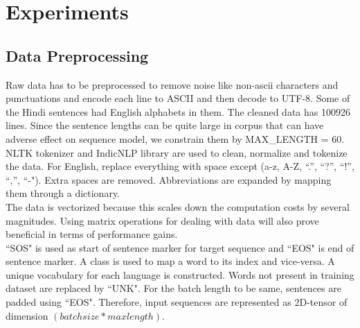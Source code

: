 \documentclass[11pt, oneside]{article}   	%
\begin{document}
\section{Experiments}

\subsection{Data Preprocessing}
Raw data has to be preprocessed to remove noise like non-ascii characters and punctuations and encode each line to ASCII and then decode to UTF-8. Some of the Hindi sentences had English alphabets in them. The cleaned data has 100926 lines. Since the sentence lengths can be quite large in corpus that can have adverse effect on sequence model, we constrain them by MAX\_LENGTH = 60.\\
NLTK tokenizer and IndicNLP library are used to clean, normalize and tokenize the data. For English, replace everything with space except (a-z, A-Z, “.”, “?”, “!”, “,”, ``-"). Extra spaces are removed. Abbreviations are expanded by mapping them through a dictionary.\\
The data is vectorized because this scales down the computation costs by several magnitudes. Using matrix operations for dealing with data will also prove beneficial in terms of performance gains.\\
``SOS" is used as start of sentence marker for target sequence and 	``EOS" is end of sentence marker. A class is used to map a word to its index and vice-versa. A unique vocabulary for each language is constructed. Words not present in training dataset are replaced by 	``UNK". For the batch length to be same, sentences are padded using ``EOS". Therefore, input sequences are represented as 2D-tensor of dimension $(batch size * max length)$.
\end{document}
